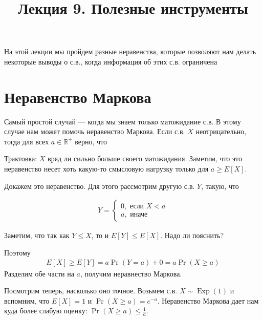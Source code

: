 \documentclass[12pt]{article}
\title{Лекция 9. Полезные инструменты}
\newcommand\R{\mathbb{R}}
\DeclareMathOperator{\Exp}{Exp}
\begin{document}
\maketitle

На этой лекции мы пройдем разные неравенства, которые позволяют нам делать некоторые выводы о с.в., когда информация об этих с.в. ограничена

\section{Неравенство Маркова}

Самый простой случай --- когда мы знаем только матожидание с.в. В этому случае нам может помочь неравенство Маркова. Если с.в. $X$ неотрицательно, тогда для всех $a \in \R^+$ верно, что 

\begin{center}
\end{center}

Трактовка: $X$ вряд ли сильно больше своего матожидания. Заметим, что это неравенство несет хоть какую-то смысловую нагрузку только для $a \ge E[X]$.

Докажем это неравенство. Для этого рассмотрим другую с.в. $Y$, такую, что

\begin{align*}
  Y = \begin{cases}
    0, \text{ если } X < a \\
    a, \text{ иначе }
  \end{cases}
\end{align*}

Заметим, что так как $Y \le X$, то и $E[Y] \le E[X]$. Надо ли пояснить?

Поэтому
\begin{align*}
  E[X] \ge E[Y] = a\Pr(Y = a) + 0 = a\Pr(X \ge a)
\end{align*}
Разделим обе части на $a$, получим неравнество Маркова.

Посмотрим теперь, насколько оно точное. Возьмем с.в. $X \sim \Exp(1)$ и вспомним, что $E[X] = 1$ и $\Pr(X \ge a) = e^{-a}$.
Неравенство Маркова дает нам куда более слабую оценку: $\Pr(X \ge a) \le \frac{1}{a}$.
\end{document}
